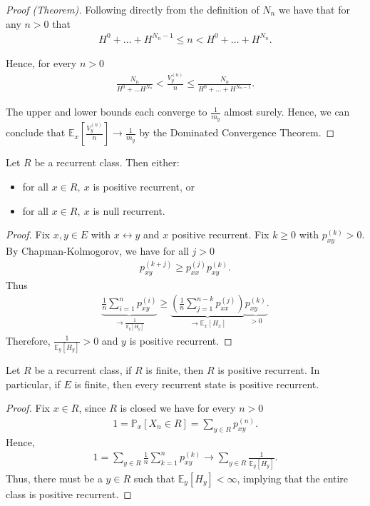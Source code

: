 \begin{proof}[Proof (Theorem)]
Following directly from the definition of $N_n$ we have that for any $n> 0$ that 
\begin{align}
	H^0 + \ldots + H^{N_n -1} \leq n < H^0 + \ldots + H^{N_n}
.\end{align}
	
Hence, for every $n> 0$ 
\begin{align}
\frac{N_n}{H^0 + \ldots H^{N_n}} < \frac{V_y^{(n)}}{n} \leq \frac{N_n}{H^0 + \ldots + H^{N_n -1}} 
.\end{align}

The upper and lower bounds each converge to $\frac{1}{m_y}$ almost surely. Hence, we can conclude that $\mathbb{E}_{x} \left[ \frac{V_y^{(n)}}{n} \right] \to \frac{1}{m_y}$ by the Dominated Convergence Theorem.
\end{proof}


\begin{prop}
	Let $R$ be a recurrent class. Then either:
\begin{itemize}
	\item for all $x \in R,\ x$ is positive recurrent, or
	\item for all $x \in R,\ x$ is null recurrent.
\end{itemize}
\end{prop}
\begin{proof}
	Fix $x,y \in E$ with $x  \leftrightarrow  y$ and $x$ positive recurrent. Fix $k\geq 0$ with $p_{xy}^{(k)}>0$. By Chapman-Kolmogorov, we have for all $j> 0$
	\begin{align}
		p_{xy}^{(k+j)} \geq p_{xx}^{(j)} p_{xy}^{(k)}	
.	\end{align}
Thus	
\begin{align}
	\underbrace{\frac{1}{n} \sum_{i=1}^{n} p_{xy}^{(i)}}_{\to  \frac{1}{\mathbb{E}_{y} \left[ H_y \right] }} \geq \underbrace{\left( \frac{1}{n} \sum_{j=1}^{n-k} p_{xx}^{(j)} \right)}_{\to \mathbb{E}_{x} \left[ H_x \right]} \underbrace{p_{xy}^{(k)}}_{>0}
.\end{align}
Therefore, $\frac{1}{\mathbb{E}_{y} \left[ H_y \right] }> 0$ and $y$ is positive recurrent.
\end{proof}


\begin{prop}[]
	Let $R$ be a recurrent class, if $R$ is finite, then $R$ is positive recurrent. In particular, if $E$ is finite, then every recurrent state is positive recurrent.
\end{prop}
\begin{proof}
	Fix $x\in R$, since $R$ is closed we have for every $n> 0$
	\begin{align}
		1 = \mathbb{P}_{x} \left[ X_n \in R \right] = \sum_{y\in R}^{} p_{xy}^{(n)}.
	\end{align}
Hence, 
\begin{align}
	1 = \sum_{y\in R}^{} \frac{1}{n} \sum_{k=1}^{n} p_{xy}^{(k)} \to \sum_{y \in R}^{} \frac{1}{\mathbb{E}_{y} \left[ H_y \right] }.
\end{align}
Thus, there must be a $y\in R$ such that $\mathbb{E}_{y} \left[ H_y \right] < \infty $, implying that the entire class is positive recurrent.
\end{proof}



